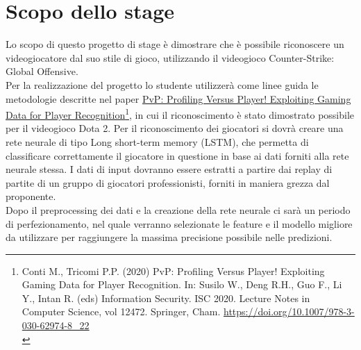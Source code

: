 \section*{Scopo dello stage}

Lo scopo di questo progetto di stage è dimostrare che è possibile riconoscere un videogiocatore dal suo stile di gioco, utilizzando il videogioco Counter-Strike: Global Offensive.\\
Per la realizzazione del progetto lo studente utilizzerà come linee guida le metodologie descritte nel paper \href{https://link.springer.com/chapter/10.1007/978-3-030-62974-8_22}{PvP: Profiling Versus Player! Exploiting Gaming Data for Player Recognition}\footnote{Conti M., Tricomi P.P. (2020) PvP: Profiling Versus Player! Exploiting Gaming Data for Player Recognition. In: Susilo W., Deng R.H., Guo F., Li Y., Intan R. (eds) Information Security. 
		ISC 2020. Lecture Notes in Computer Science, vol 12472. Springer, Cham. \href{https://doi.org/10.1007/978-3-030-62974-8_22}{https://doi.org/10.1007/978-3-030-62974-8\_22}\\},
		 in cui il riconoscimento è stato dimostrato possibile per il videogioco Dota 2.
Per il riconoscimento dei giocatori si dovrà creare una rete neurale di tipo Long short-term memory (LSTM), che permetta di classificare correttamente il giocatore in questione in base ai dati forniti alla rete neurale stessa. 
I dati di input dovranno essere estratti a partire dai replay di partite di un gruppo di giocatori professionisti, forniti in maniera grezza dal proponente.\\

Dopo il preprocessing dei dati e la creazione della rete neurale ci sarà un periodo di perfezionamento, nel quale verranno selezionate le feature e il modello migliore da utilizzare per raggiungere la massima precisione possibile nelle predizioni.

